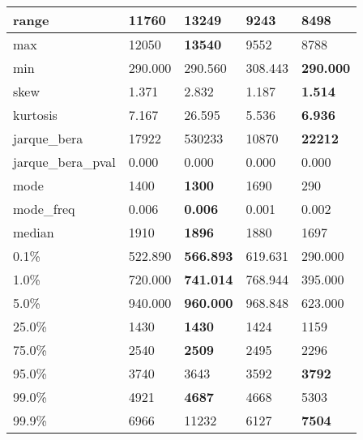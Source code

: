 \begin{table}[H]
\begin{tabular}{|l|m{10em}|m{10em}|m{10em}|m{10em}|}
\hline range & 11760 & \bfseries 13249 & 9243 & \cellcolor[rgb]{0.9, 0.54, 0.52} 8498 \\
\hline max & 12050 & \bfseries 13540 & 9552 & \cellcolor[rgb]{0.9, 0.54, 0.52} 8788 \\
\hline min & 290.000 & 290.560 & \cellcolor[rgb]{0.9, 0.54, 0.52} 308.443 & \bfseries 290.000 \\
\hline skew & 1.371 & \cellcolor[rgb]{0.9, 0.54, 0.52} 2.832 & 1.187 & \bfseries 1.514 \\
\hline kurtosis & 7.167 & \cellcolor[rgb]{0.9, 0.54, 0.52} 26.595 & 5.536 & \bfseries 6.936 \\
\hline jarque\_bera & 17922 & \cellcolor[rgb]{0.9, 0.54, 0.52} 530233 & 10870 & \bfseries 22212 \\
\hline jarque\_bera\_pval & 0.000 & 0.000 & 0.000 & 0.000 \\
\hline mode & 1400 & \bfseries 1300 & 1690 & \cellcolor[rgb]{0.9, 0.54, 0.52} 290 \\
\hline mode\_freq & 0.006 & \bfseries 0.006 & \cellcolor[rgb]{0.9, 0.54, 0.52} 0.001 & 0.002 \\
\hline median & 1910 & \bfseries 1896 & 1880 & \cellcolor[rgb]{0.9, 0.54, 0.52} 1697 \\
\hline 0.1\% & 522.890 & \bfseries 566.893 & 619.631 & \cellcolor[rgb]{0.9, 0.54, 0.52} 290.000 \\
\hline 1.0\% & 720.000 & \bfseries 741.014 & 768.944 & \cellcolor[rgb]{0.9, 0.54, 0.52} 395.000 \\
\hline 5.0\% & 940.000 & \bfseries 960.000 & 968.848 & \cellcolor[rgb]{0.9, 0.54, 0.52} 623.000 \\
\hline 25.0\% & 1430 & \bfseries 1430 & 1424 & \cellcolor[rgb]{0.9, 0.54, 0.52} 1159 \\
\hline 75.0\% & 2540 & \bfseries 2509 & 2495 & \cellcolor[rgb]{0.9, 0.54, 0.52} 2296 \\
\hline 95.0\% & 3740 & 3643 & \cellcolor[rgb]{0.9, 0.54, 0.52} 3592 & \bfseries 3792 \\
\hline 99.0\% & 4921 & \bfseries 4687 & 4668 & \cellcolor[rgb]{0.9, 0.54, 0.52} 5303 \\
\hline 99.9\% & 6966 & \cellcolor[rgb]{0.9, 0.54, 0.52} 11232 & 6127 & \bfseries 7504 \\
\hline
\end{tabular}
\end{table}

